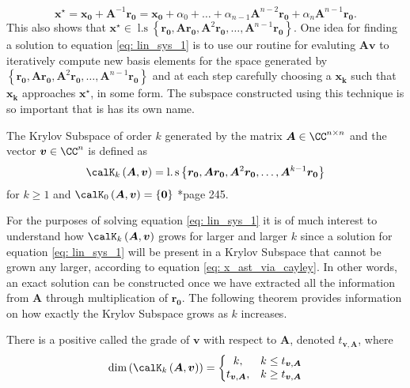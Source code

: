 \begin{equation} \label{eq: x_ast_via_cayley}
    \bm{x^{\star}} = \bm{x_0} + \bm{A}^{-1} \bm{r_0} = \bm{x_0} + \alpha_0 + \ldots + \alpha_{n-1} \bm{A}^{n-2} \bm{r_0} + \alpha_{n} \bm{A}^{n-1} \bm{r_0}.
\end{equation}
This also shows that $\bm{x^{\star}} \in \operatorname{l.s} \left\{ \bm{r_0}, \bm{A} \bm{r_0}, \bm{A}^2 \bm{r_0}, \ldots , \bm{A}^{n-1} \bm{r_0} \right\}$. One idea for finding a solution to equation \ref{eq: lin_sys_1} is to use our routine for evaluting $\bm{A} \bm{v}$ to iteratively compute new basis elements for the space generated by $\left\{ \bm{r_0}, \bm{A} \bm{r_0}, \bm{A}^2 \bm{r_0}, \ldots , \bm{A}^{n-1} \bm{r_0} \right\}$ and at each step carefully choosing a $\bm{x_k}$ such that $\bm{x_k}$ approaches $\bm{x^{\star}}$, in some form. The subspace constructed using this technique is so important that is has its own name.
\begin{defe} \label{defe: krylov_subspace}
    The Krylov Subspace of order $k$ generated by the matrix $\bm{A} \in \CC^{n \times n}$ and the vector $\bm{v} \in \CC^{n}$ is defined as
    \[
        \calK_{k} \left( \bm{A},\bm{v} \right) = \operatorname{l.s} \left\{ \bm{r_0}, \bm{A} \bm{r_0}, \bm{A}^2 \bm{r_0}, \ldots , \bm{A}^{k-1} \bm{r_0} \right\}
    \]
    for $k \geq 1$ and $\calK_{0} \left( \bm{A},\bm{v} \right) = \left\{ \bm{0} \right\}$ \cite{TrefethenLloydN.LloydNicholas1997Nla/}*{page 245}.
\end{defe}
For the purposes of solving equation \ref{eq: lin_sys_1} it is of much interest to understand how $\calK_{k} \left( \bm{A},\bm{v} \right)$ grows for larger and larger $k$ since a solution for equation \ref{eq: lin_sys_1} will be present in a Krylov Subspace that cannot be grown any larger, according to equation \ref{eq: x_ast_via_cayley}. In other words, an exact solution can be constructed once we have extracted all the information from $\bm{A}$ through multiplication of $\bm{r_0}$. The following theorem provides information on how exactly the Krylov Subspace grows as $k$ increases.
\begin{thm} \label{theorem: grade_of_v}
    There is a positive called the grade of $\bm{v}$ with respect to $\bm{A}$, denoted $t_{\bm{v}, \bm{A}}$, where
    \[
        \operatorname{dim} \left( \calK_{k} \left( \bm{A} , \bm{v} \right) \right) = \left\{
        \begin{matrix}
            k,                  & k \leq t_{\bm{v}, \bm{A}} \\
            t_{\bm{v}, \bm{A}}, & k \geq t_{\bm{v}, \bm{A}}
        \end{matrix}
        \right.
    \]
\end{thm}
